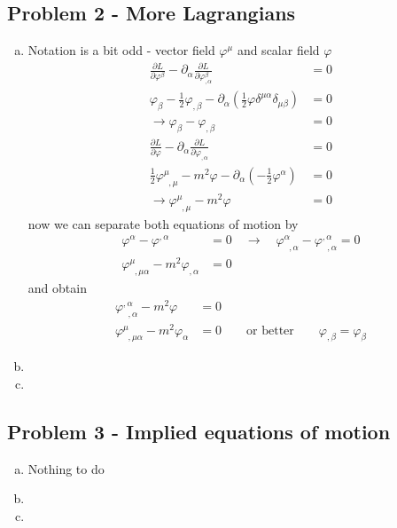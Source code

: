 \documentclass[../main.tex]{subfiles}
\begin{document}
\subsection{Problem 2 - More Lagrangians}
\begin{enumerate}[(a)]
\item Notation is a bit odd - vector field $\varphi^\mu$ and scalar field $\varphi$
\begin{align}
\frac{\partial L}{\partial\varphi^\beta}-\partial_\alpha\frac{\partial L}{\partial\varphi^\beta_{,\alpha}}&=0\\
\varphi_\beta-\frac{1}{2}\varphi_{,\beta}-\partial_\alpha\left(\frac{1}{2}\varphi\delta^{\mu\alpha}\delta_{\mu\beta}\right)&=0\\
\rightarrow\varphi_\beta-\varphi_{,\beta}&=0\\
\frac{\partial L}{\partial\varphi}-\partial_\alpha\frac{\partial L}{\partial\varphi_{,\alpha}}&=0\\
\frac{1}{2}\varphi^\mu_{\;\;,\mu}-m^2\varphi-\partial_\alpha\left(-\frac{1}{2}\varphi^\alpha\right)&=0\\
\rightarrow \varphi^\mu_{\;\;,\mu}-m^2\varphi&=0
\end{align}
now we can separate both equations of motion by
\begin{align}
\varphi^\alpha-\varphi^{,\alpha}&=0\quad\rightarrow\quad \varphi^\alpha_{\;\;,\alpha}-\varphi^{,\alpha}_{\;\;,\alpha}=0\\
\varphi^\mu_{\;\;,\mu\alpha}-m^2\varphi_{,\alpha}&=0
\end{align}
and obtain
\begin{align}
\varphi^{,\alpha}_{\;\;,\alpha}-m^2\varphi&=0\\
\varphi^\mu_{\;\;,\mu\alpha}-m^2\varphi_\alpha&=0\qquad\text{or better}\qquad\varphi_{,\beta}=\varphi_\beta
\end{align}
\item
\item
\end{enumerate}

\subsection{Problem 3 - Implied equations of motion}
\begin{enumerate}[(a)]
\item Nothing to do
\item 
\item
\end{enumerate}
\end{document}
